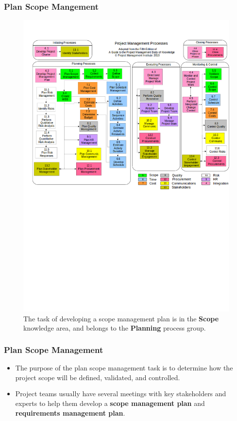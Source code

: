 \documentclass[aspectratio=169]{beamer}
\begin{document}
\begin{frame}
\frametitle{Plan Scope Mangement}
\vspace{-0.5cm}
\begin{figure}
\caption{The task of developing a scope management plan is in the \textbf{Scope} knowledge area, and belongs to the \textbf{Planning} process group.}
\vspace{-0.8cm}
\includegraphics[scale=0.3]{mapping}
\end{figure}
\end{frame}


\begin{frame}
\frametitle{Plan Scope Management}
\begin{itemize}
\item The purpose of the plan scope management task is to determine how the project scope will be defined, validated, and controlled.
\vspace{0.5cm}
\item Project teams usually have several meetings with key stakeholders and experts to help them develop a \textbf{scope management plan} and \textbf{requirements management plan}.
\end{itemize}
\end{frame}
\end{document}
